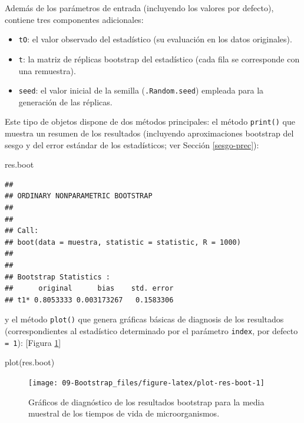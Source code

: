\documentclass[
]{book}
\newenvironment{Shaded}{\begin{snugshade}}{\end{snugshade}}
\newcommand{\FunctionTok}[1]{\textcolor[rgb]{0.00,0.00,0.00}{#1}}
\newcommand{\NormalTok}[1]{#1}
\theoremstyle{break}
\theoremstyle{nonumberplain}
\begin{document}
Además de los parámetros de entrada (incluyendo los valores por defecto), contiene tres componentes adicionales:

\begin{itemize}
\item
  \texttt{tO}: el valor observado del estadístico
  (su evaluación en los datos originales).
\item
  \texttt{t}: la matriz de réplicas bootstrap del estadístico
  (cada fila se corresponde con una remuestra).
\item
  \texttt{seed}: el valor inicial de la semilla (\texttt{.Random.seed})
  empleada para la generación de las réplicas.
\end{itemize}

Este tipo de objetos dispone de dos métodos principales:
el método \texttt{print()} que muestra un resumen de los resultados
(incluyendo aproximaciones bootstrap del sesgo y del error
estándar de los estadísticos; ver Sección \ref{sesgo-prec}):

\begin{Shaded}
\begin{Highlighting}[]
\NormalTok{res.boot}
\end{Highlighting}
\end{Shaded}

\begin{verbatim}
## 
## ORDINARY NONPARAMETRIC BOOTSTRAP
## 
## 
## Call:
## boot(data = muestra, statistic = statistic, R = 1000)
## 
## 
## Bootstrap Statistics :
##      original      bias    std. error
## t1* 0.8053333 0.003173267   0.1583306
\end{verbatim}

y el método \texttt{plot()} que genera gráficas básicas de diagnosis
de los resultados (correspondientes al estadístico determinado por el parámetro \texttt{index}, por defecto \texttt{=\ 1}): {[}Figura \ref{fig:plot-res-boot}{]}

\begin{Shaded}
\begin{Highlighting}[]
\FunctionTok{plot}\NormalTok{(res.boot)}
\end{Highlighting}
\end{Shaded}

\begin{figure}[!htb]

{\centering \texttt{[image: 09-Bootstrap\_files/figure-latex/plot-res-boot-1]} 

}

\caption{Gráficos de diagnóstico de los resultados bootstrap para la media muestral de los tiempos de vida de microorganismos.}\label{fig:plot-res-boot}
\end{figure}
\end{document}
